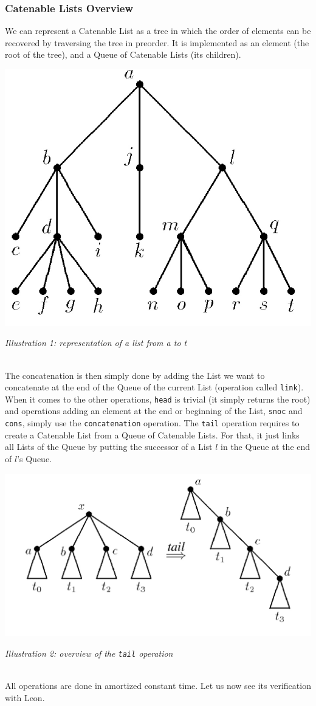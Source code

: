 \subsubsection{Catenable Lists Overview}
We can represent a Catenable List as a tree 
in which the order of elements can be recovered by traversing the tree in preorder.
It is implemented as an element (the root of the tree), 
and a Queue of Catenable Lists (its children).
\\
\centerline{\includegraphics[scale=0.17]{preorder}}
\centerline{\emph{Illustration 1: representation of a list from a to t}}
\centerline{}
\\
The concatenation is then simply done by adding the List we want to concatenate 
at the end of the Queue of the current List 
(operation called \verb|link|).
When it comes to the other operations,
\verb|head| is trivial (it simply returns the root)
and operations adding an element at the end or beginning of the List, 
\verb|snoc| and \verb|cons|,
simply use the \verb|concatenation| operation.
The \verb|tail| operation requires 
to create a Catenable List from a Queue of Catenable Lists.
For that, it just links all Lists of the Queue 
by putting the successor of a List $l$ in the Queue at the end of $l$'s Queue.
\\
\centerline{\includegraphics[scale=0.17]{link}}
\centerline{\emph{Illustration 2: overview of the \texttt{tail} operation}}
\centerline{}
\\
All operations are done in amortized constant time.
Let us now see its verification with Leon.

